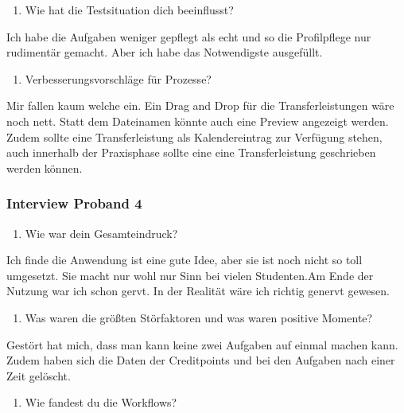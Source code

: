 \documentclass[
  12pt,
  ngerman,
  a4paper,
]{article}
\providecommand{\tightlist}{%
  \setlength{\itemsep}{0pt}\setlength{\parskip}{0pt}}
\begin{document}
\begin{enumerate}
\def\labelenumi{\arabic{enumi}.}
\setcounter{enumi}{3}
\tightlist
\item
  Wie hat die Testsituation dich beeinflusst?
\end{enumerate}

Ich habe die Aufgaben weniger gepflegt als echt und so die Profilpflege
nur rudimentär gemacht. Aber ich habe das Notwendigste ausgefüllt.

\begin{enumerate}
\def\labelenumi{\arabic{enumi}.}
\setcounter{enumi}{4}
\tightlist
\item
  Verbesserungsvorschläge für Prozesse?
\end{enumerate}

Mir fallen kaum welche ein. Ein Drag and Drop für die Transferleistungen
wäre noch nett. Statt dem Dateinamen könnte auch eine Preview angezeigt
werden. Zudem sollte eine Transferleistung als Kalendereintrag zur
Verfügung stehen, auch innerhalb der Praxisphase sollte eine eine
Transferleistung geschrieben werden können.

\hypertarget{interview-proband-4}{%
\subsubsection{Interview Proband 4}\label{interview-proband-4}}

\begin{enumerate}
\def\labelenumi{\arabic{enumi}.}
\tightlist
\item
  Wie war dein Gesamteindruck?
\end{enumerate}

Ich finde die Anwendung ist eine gute Idee, aber sie ist noch nicht so
toll umgesetzt. Sie macht nur wohl nur Sinn bei vielen Studenten.Am Ende
der Nutzung war ich schon gervt. In der Realität wäre ich richtig
genervt gewesen.

\begin{enumerate}
\def\labelenumi{\arabic{enumi}.}
\setcounter{enumi}{1}
\tightlist
\item
  Was waren die größten Störfaktoren und was waren positive Momente?
\end{enumerate}

Gestört hat mich, dass man kann keine zwei Aufgaben auf einmal machen
kann. Zudem haben sich die Daten der Creditpoints und bei den Aufgaben
nach einer Zeit gelöscht.

\begin{enumerate}
\def\labelenumi{\arabic{enumi}.}
\setcounter{enumi}{2}
\tightlist
\item
  Wie fandest du die Workflows?
\end{enumerate}
\end{document}
